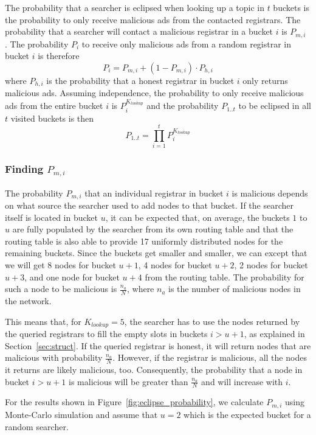 The probability that a searcher is eclipsed when looking up a topic in $t$ buckets is the probability to only receive malicious ads from the contacted registrars. The probability that a searcher will contact a malicious registrar in a bucket $i$ is $P_{m,i}$ .
The probability $P_i$ to receive only malicious ads from a random registrar in bucket $i$ is therefore
$$ P_{i} = P_{m,i} + (1-P_{m,i}) \cdot P_{h,i}$$
where $P_{h,i}$ is the probability that a honest registrar in bucket $i$ only returns malicious ads.
Assuming independence, the probability to only receive malicious ads from the entire bucket $i$ is $P_{i}^{K_\textit{lookup}}$ and the probability $P_{1..t}$ to be eclipsed in all $t$ visited buckets is then
$$ P_{1..t} = \prod_{i=1}^{t} P_{i}^{K_\textit{lookup}}$$

\subsubsection{Finding $P_{m,i}$}

The probability $P_{m,i}$ that an individual registrar in bucket $i$ is malicious depends on what source the searcher used to add nodes to that bucket.
If the searcher itself is located in bucket $u$, it can be expected that, on average, the buckets $1$ to $u$ are fully populated by the searcher from its own routing table and that the routing table is also able to provide 17 uniformly distributed nodes for the remaining buckets. Since the buckets get smaller and smaller, we can except that we will get 8 nodes for bucket $u+1$, 4 nodes for bucket $u+2$, 2 nodes for bucket $u+3$, and one node for bucket $u+4$ from the routing table.
The probability for such a node to be malicious is $\frac{n_a}{N}$, where $n_a$ is the number of malicious nodes in the network.

This means that, for $K_\textit{lookup}=5$, the searcher has to use the nodes returned by the queried registrars to fill the empty slots in buckets $i>u+1$, as explained in Section~\ref{sec:struct}. If the queried registrar is honest, it will return nodes that are malicious with probability $\frac{n_a}{N}$. However, if the registrar is malicious, all the nodes it returns are likely malicious, too. Consequently, the probability that a node in bucket $i>u+1$ is malicious will be greater than $\frac{n_a}{N}$ and will increase with $i$.

For the results shown in Figure~\ref{fig:eclipse_probability}, we calculate $P_{m,i}$ using Monte-Carlo simulation and assume that $u=2$ which is the expected bucket for a random searcher.


